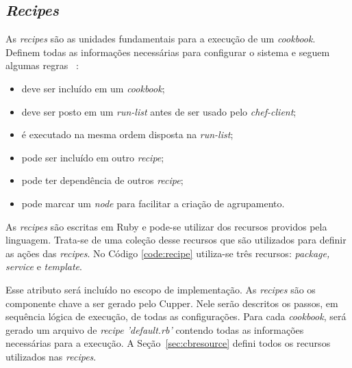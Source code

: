 
\subsection{\textit{Recipes}}
\label{sec:lev-rec-rec}

As \textit{recipes} são as unidades fundamentais para a execução de um \textit{cookbook}. Definem
todas as informações necessárias para configurar o sistema e seguem algumas regras
~\cite{chefdoc:2016}:

\begin{itemize}
  \item deve ser incluído em um \textit{cookbook};
  \item deve ser posto em um \textit{run-list} antes de ser usado pelo \textit{chef-client};
  \item é executado na mesma ordem disposta na \textit{run-list};
  \item pode ser incluído em outro \textit{recipe};
  \item pode ter dependência de outros \textit{recipe};
  \item pode marcar um \textit{node} para facilitar a criação de agrupamento.
\end{itemize}

As \textit{recipes} são escritas em Ruby e pode-se utilizar dos recursos providos
pela linguagem. Trata-se de uma coleção desse recursos que são utilizados
para definir as ações das \textit{recipes}. No Código \ref{code:recipe} utiliza-se
três recursos: \textit{package, service} e \textit{template}.

\begin{minipage}{.90\textwidth}
  \lstset{style=shell}
  
\end{minipage}

Esse atributo será incluído no escopo de implementação. As \textit{recipes} são os componente chave a
ser gerado pelo Cupper. Nele serão descritos os passos, em sequência lógica de execução,
de todas as configurações. Para cada \textit{cookbook}, será gerado um arquivo de 
\textit{recipe 'default.rb'} contendo todas as informações necessárias para a execução.
A Seção~\ref{sec:cbresource} defini todos os recursos utilizados nas \textit{recipes}.
